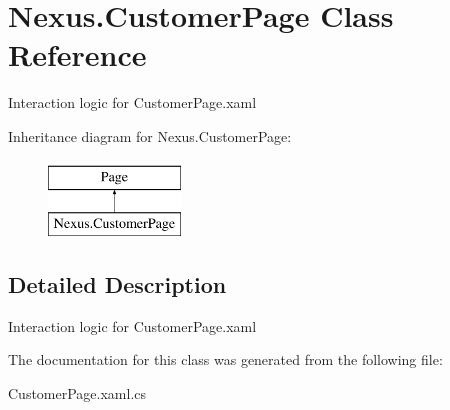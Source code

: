 \hypertarget{class_nexus_1_1_customer_page}{}\section{Nexus.\+Customer\+Page Class Reference}
\label{class_nexus_1_1_customer_page}


Interaction logic for Customer\+Page.\+xaml  


Inheritance diagram for Nexus.\+Customer\+Page\+:\begin{figure}[H]
\begin{center}
\leavevmode
\includegraphics[height=2.000000cm]{class_nexus_1_1_customer_page}
\end{center}
\end{figure}


\subsection{Detailed Description}
Interaction logic for Customer\+Page.\+xaml 



The documentation for this class was generated from the following file\+:\begin{DoxyCompactItemize}
\item 
Customer\+Page.\+xaml.\+cs\end{DoxyCompactItemize}
